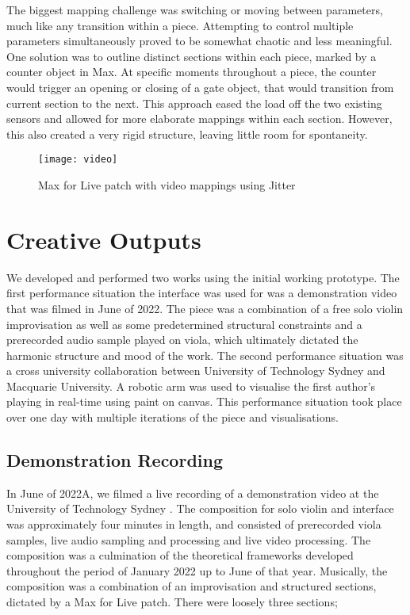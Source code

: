 \documentclass{nime-alternate}
\begin{document}
The biggest mapping challenge was switching or moving between parameters, much like any transition within a piece. Attempting to control multiple parameters simultaneously proved to be somewhat chaotic and less meaningful. One solution was to outline distinct sections within each piece, marked by a counter object in Max. At specific moments throughout a piece, the counter would trigger an opening or closing of a gate object, that would transition from current section to the next. This approach eased the load off the two existing sensors and allowed for more elaborate mappings within each section. However, this also created a very rigid structure, leaving little room for spontaneity.

\begin{figure}[t]
	\centering
		\texttt{[image: video]}
	\caption{Max for Live patch with video mappings using Jitter}
	\label{fig:video}
\end{figure}

\section{Creative Outputs}
We developed and performed  two works using the initial working prototype. The first performance situation the interface was used for was a demonstration video that was filmed in June of 2022. The piece was a combination of a free solo violin improvisation as well as some predetermined structural constraints and a prerecorded audio sample played on viola, which ultimately dictated the harmonic structure and mood of the work. The second performance  situation was a cross university collaboration between University of Technology Sydney and Macquarie University. A robotic arm was used to visualise the first author's playing in real-time using paint on canvas. This performance situation took place over one day with multiple iterations of the piece and visualisations.


\subsection{Demonstration Recording}

In June of 2022A, we filmed a live recording of a demonstration video at the University of Technology Sydney . The composition for solo violin and interface was approximately four minutes in length, and consisted of prerecorded viola samples, live audio sampling and processing and live video processing. The composition was a culmination of the theoretical frameworks developed throughout the period of January 2022 up to June of that year. Musically, the composition was a combination of an improvisation and structured sections, dictated by a Max for Live patch. There were loosely three sections;
\end{document}
